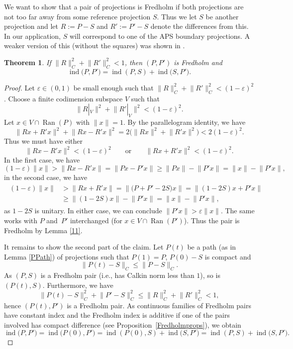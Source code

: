 \documentclass[pdftex]{sigma}
\numberwithin{equation}{section}
\newtheorem{Theorem}{Theorem}[section]
\DeclareMathOperator{\Ran}{Ran}
\DeclareMathOperator{\ind}{ind}
\begin{document}
		We want to show that a pair of projections is Fredholm if both projections are not too far away from some reference projection $S$.
	Thus we let $S$ be another projection and let $R:=P-S$ and $R':=P'-S$ denote the differences from this. In our application, $S$ will correspond to one of the APS boundary projections. A weaker version of this (without the squares) was shown in \cite[Proposition~5.3.15]{DSW}.
	\begin{Theorem}
		\label{Cnormfred}
		If $\|R\|_C^2+\bigl\|R'\bigr\|_C^2<1$,  then $(P,P')$ is Fredholm and
		\[ \ind\bigl(P,P'\bigr)=\ind(P,S)+\ind\bigl(S,P'\bigr).\]
	\end{Theorem}
	\begin{proof}
		Let $\varepsilon\in(0,1)$ be small enough such that
$\|R\|_C^2+\bigl\|R'\bigr\|_C^2<(1-\varepsilon)^2$.
		Choose a finite codimension subspace $V$ such that
		\[\|R|_V\|^2+\bigl\|R' |_V\bigr\|^2<(1-\varepsilon)^2.\]
		Let $x\in V\cap \Ran(P)$ with $\|x\|=1$. By the parallelogram identity, we have
		\[\bigl\|Rx+R'x\bigr\|^2+\bigl\|Rx-R'x\bigr\|^2=2\bigl(\|Rx\|^2+\bigl\|R'x\bigr\|^2\bigr)<2(1-\varepsilon)^2. \]
		Thus we must have either
		\[\bigl\|Rx-R'x\bigr\|^2<(1-\varepsilon)^2\qquad \text{or}\qquad
		 \bigl\|Rx+R'x\bigr\|^2<(1-\varepsilon)^2.\]
		In the first case, we have
		\[(1-\varepsilon)\|x\|>\bigl\|Rx-R'x\bigr\|=\bigl\|Px-P'x\bigr\|\geq\|Px\|-\bigl\|P'x\bigr\|=\|x\|-\bigl\|P'x\bigr\|,\]
		in the second case, we have
		\begin{align*}
\begin{split}
			(1-\varepsilon)\|x\|&>\bigl\|Rx+R'x \bigr\|
			 =\bigl\|\bigl(P+P'-2S\bigr)x\bigr\|
			 =\bigl\|(1-2S)x+P'x\bigr\|\\
			&\geq\|(1-2S)x\|-\bigl\|P'x\bigr\|
			 =\|x\|-\bigl\|P'x\bigr\|,
\end{split}
		\end{align*}
		as $1-2S$ is unitary.
		In either case, we can conclude $\|P'x\|>\varepsilon\|x\|$. The same works with $P$ and~$P'$ interchanged (for $x\in V\cap\Ran(P')$). Thus the pair is Fredholm by Lemma \ref{11}.
		
		It remains to show the second part of the claim. Let $P(t)$ be a path (as in Lemma \ref{PPath}) of projections such that $P(1)=P$, $P(0)-S$ is compact and
		\[\|P(t)-S\|_C\leq \|P-S\|_C.\]
		As $(P,S)$ is a Fredholm pair (i.e., has Calkin norm less than $1$), so is $(P(t),S)$. Furthermore, we have
		\[\|P(t)-S\|_C^2+\bigl\|P'-S\bigr\|_C^2\leq \|R\|_C^2+\bigl\|R'\bigr\|_C^2<1,\]
		hence $(P(t),P')$ is a Fredholm pair. As continuous families of Fredholm pairs have constant index and the Fredholm index is additive if one of the pairs involved has compact difference (see Proposition~\ref{Fredholmprops}), we obtain
		\[
        \ind\bigl(P,P'\bigr)=\ind\bigl(P(0),P'\bigr)=\ind(P(0),S)+\ind\bigl(S,P'\bigr)=\ind(P,S)+\ind\bigl(S,P'\bigr).
        \tag*{\qed}
        \]
\renewcommand{\qed}{}
\end{proof}
		
\end{document}
